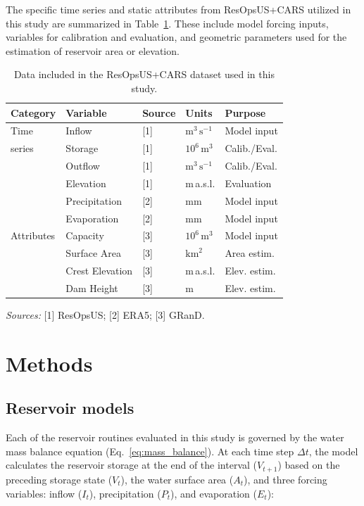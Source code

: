 \documentclass[hess, manuscript]{copernicus}
\begin{document}
The specific time series and static attributes from ResOpsUS+CARS utilized in this study are summarized in Table~\ref{tab:data}. These include model forcing inputs, variables for calibration and evaluation, and geometric parameters used for the estimation of reservoir area or elevation.

\begin{table}[t]
    \centering
    \caption{Data included in the ResOpsUS+CARS dataset used in this study.}
    \label{tab:data}
    \begin{tabular*}{\columnwidth}{@{\extracolsep{\fill}}lllll}
        \toprule
        \textbf{Category} & \textbf{Variable} & \textbf{Source} & \textbf{Units} & \textbf{Purpose} \\
        \midrule
        Time & Inflow & [1] & $\text{m}^3\,\text{s}^{-1}$ & Model input \\
        series & Storage & [1] & $10^6\,\text{m}^3$ & Calib./Eval. \\
        & Outflow & [1] & $\text{m}^3\,\text{s}^{-1}$ & Calib./Eval. \\
        & Elevation & [1] & m\,a.s.l. & Evaluation \\
        & Precipitation & [2] & mm & Model input \\
        & Evaporation & [2] & mm & Model input \\
        \midrule
        Attributes & Capacity & [3] & $10^6\,\text{m}^3$ & Model input \\
        & Surface Area & [3] & $\text{km}^2$ & Area estim. \\
        & Crest Elevation & [3] & m\,a.s.l. & Elev. estim. \\
        & Dam Height & [3] & m & Elev. estim. \\
        \bottomrule
    \end{tabular*}
    \small
    \smallskip
    \textit{Sources:} [1] ResOpsUS; [2] ERA5; [3] GRanD.
\end{table}

\section{Methods}
\label{sec:methods}

\subsection{Reservoir models}
\label{sec:reservoir_models}

Each of the reservoir routines evaluated in this study is governed by the water mass balance equation (Eq.~\ref{eq:mass_balance}). At each time step $\Delta t$, the model calculates the reservoir storage at the end of the interval ($V_{t+1}$) based on the preceding storage state ($V_t$), the water surface area ($A_t$), and three forcing variables: inflow ($I_t$), precipitation ($P_t$), and evaporation ($E_t$):
\end{document}
